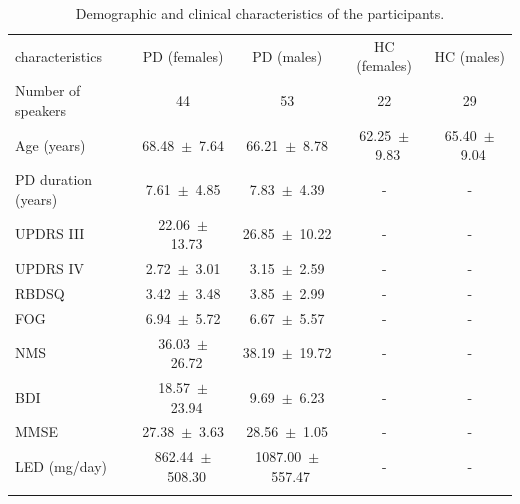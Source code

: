 \begin{table}[htb!]
	\centering
	\begin{threeparttable}
		\caption{Demographic and clinical characteristics of the participants.}
		\label{tab:ch4_clinical_data}
		\footnotesize
		\centering
		
		\begin{tabular}{l c c c c}
			\hline\hline\noalign{\smallskip}
			\rowcolor{gray_table}
			characteristics & PD (females) & PD (males) & HC (females) & HC (males) \\
			\noalign{\smallskip}\hline\noalign{\smallskip}

			Number of speakers  &           44         &           53         &           22         &           29         \\
			Age (years)         &   68.48~$\pm$~7.64   &   66.21~$\pm$~8.78   &   62.25~$\pm$~9.83   &   65.40~$\pm$~9.04   \\
			PD duration (years) &    7.61~$\pm$~4.85   &    7.83~$\pm$~4.39   &           -          &           -          \\
			UPDRS III           &   22.06~$\pm$~13.73  &   26.85~$\pm$~10.22  &           -          &           -          \\
			UPDRS IV            &    2.72~$\pm$~3.01   &    3.15~$\pm$~2.59   &           -          &           -          \\
			RBDSQ               &    3.42~$\pm$~3.48   &    3.85~$\pm$~2.99   &           -          &           -          \\
			FOG                 &    6.94~$\pm$~5.72   &    6.67~$\pm$~5.57   &           -          &           -          \\
			NMS                 &   36.03~$\pm$~26.72  &   38.19~$\pm$~19.72  &           -          &           -          \\
			BDI                 &   18.57~$\pm$~23.94  &    9.69~$\pm$~6.23   &           -          &           -          \\
			MMSE                &   27.38~$\pm$~3.63   &   28.56~$\pm$~1.05   &           -          &           -          \\
			LED (mg/day)        &  862.44~$\pm$~508.30 & 1087.00~$\pm$~557.47 &           -          &           -          \\
			
			\noalign{\smallskip}\hline\hline
		\end{tabular}
		

\end{threeparttable}
\end{table}

